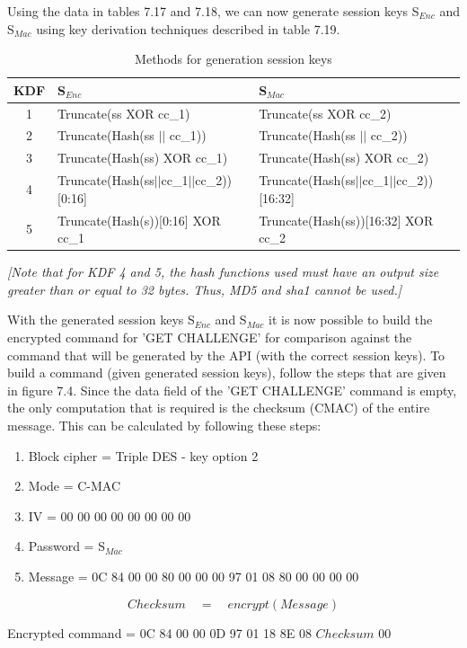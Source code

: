 \documentclass[bsc,frontabs,twoside,singlespacing,parskip,deptreport]{infthesis}     %
\begin{document}
Using the data in tables 7.17 and 7.18, we can now generate session keys S$_{Enc}$ and S$_{Mac}$ using key derivation techniques described in table 7.19.

\begin{table}[H]
\begin{tabular}{|c|l|l|}
\hline
KDF & S$_{Enc}$ & S$_{Mac}$\\
\hline
1 & Truncate(ss XOR cc\_1) & Truncate(ss XOR cc\_2)\\
\hline
2 & Truncate(Hash(ss $||$ cc\_1)) & Truncate(Hash(ss $||$ cc\_2)) \\
\hline
3 & Truncate(Hash(ss) XOR cc\_1) & Truncate(Hash(ss) XOR cc\_2)\\
\hline
4 & Truncate(Hash(ss$||$cc\_1$||$cc\_2))[0:16] & Truncate(Hash(ss$||$cc\_1$||$cc\_2))[16:32]\\
\hline
5 & Truncate(Hash(s))[0:16] XOR cc\_1 & Truncate(Hash(ss))[16:32] XOR cc\_2\\
\hline
\end{tabular}
\caption{Methods for generation session keys}
\end{table}

\textit{[Note that for KDF 4 and 5, the hash functions used must have an output size greater than or equal to 32 bytes. Thus, MD5 and sha1 cannot be used.]}

With the generated session keys S$_{Enc}$ and S$_{Mac}$ it is now possible to build the encrypted command for 'GET CHALLENGE' for comparison against the command that will be generated by the API (with the correct session keys). To build a command (given generated session keys), follow the steps that are given in figure 7.4. Since the data field of the 'GET CHALLENGE' command is empty, the only computation that is required is the checksum (CMAC) of the entire message. This can be calculated by following these steps:

\begin{enumerate}
\item Block cipher = Triple DES - key option 2
\item Mode = C-MAC
\item IV = 00 00 00 00 00 00 00 00 
\item Password = S$_{Mac}$
\item Message = 0C 84 00 00 80 00 00 00 97 01 08 80 00 00 00 00
\end{enumerate}

$$ Checksum \quad = \quad encrypt(Message) $$

Encrypted command = 0C 84 00 00 0D 97 01 18 8E 08 $Checksum$ 00\\
\end{document}
